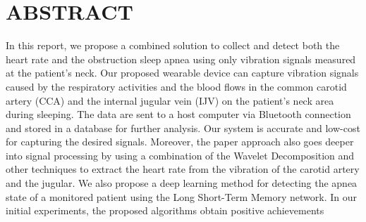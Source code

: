 \chapter*{ABSTRACT}

In this report, we propose a combined solution to collect and detect both the heart rate and the obstruction sleep apnea using only vibration signals measured at the patient’s neck. Our proposed wearable device can capture vibration signals caused by the respiratory activities and the blood flows in the common carotid artery (CCA) and the internal jugular vein (IJV) on the patient's neck area during sleeping. The data are sent to a host computer via Bluetooth connection and stored in a database for further analysis. Our system is accurate and low-cost for capturing the desired signals. Moreover, the paper approach also goes deeper into signal processing by using a combination of the Wavelet Decomposition and other techniques to extract the heart rate from the vibration of the carotid artery and the jugular. We also propose a deep learning method for detecting the apnea state of a monitored patient using the Long Short-Term Memory network. In our initial experiments, the proposed algorithms obtain positive achievements

\newpage